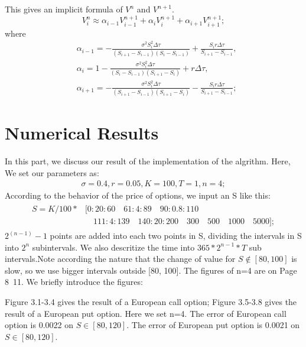 \documentclass[final]{siamltex}
\begin{document}
This gives an implicit formula of $V^n$ and $V^{n+1}$.
\begin{equation}
V_i^n \approx \alpha _{i-1} V_{i-1}^{n+1} + \alpha _{i} V_{i}^{n+1} + \alpha _{i+1} V_{i+1}^{n+1};
\label{FVM_Split}
\end{equation}
where 
\begin{equation}
\begin{split}
& \alpha_{i-1}  =  -\frac {\sigma^2 S_i^2 \Delta \tau}{(S_{i+1} -S_{i-1}) (S_{i}-S_{i-1})} + \frac{S_i r \Delta \tau} {S_{i+1}-S_{i-1}},\\
& \alpha_{i}  = 1 - \frac {\sigma^2 S_i^2 \Delta \tau}{(S_{i}-S_{i-1}) (S_{i+1}-S_i)} + r \Delta \tau,\\
& \alpha_{i+1}  = -\frac {\sigma^2 S_i^2 \Delta \tau}{(S_{i+1} -S_{i-1}) (S_{i+1}-S_i)} - \frac{S_i r \Delta \tau} {S_{i+1}-S_{i-1}};
\end{split}
\label{FVM_Coef}
\end{equation}

\section{Numerical Results}
In this part, we discuss our result of the implementation of the algrithm. Here, We set our parameters as:
\begin{align*}
\sigma = 0.4,
r = 0.05,
K = 100,
T = 1,
n=4;
\end{align*}
According to the behavior of the price of options, we input an S like this:
\begin{align*}
\begin{split}
S =  K/100*&[0:20:60 \quad 61:4:89 \quad 90:0.8:110 \quad \\
 & \quad 111:4:139 \quad 140:20:200 \quad 300 \quad 500 \quad 1000 \quad 5000];
\end{split}
\end{align*}
$2^{(n-1)}-1$ points are added into each two points in S, dividing the intervals in S into $2^n$ subintervals. We also descritize the time into $365*2^{n-1}*T$ sub intervals.Note according the nature that the change of value for $S \notin [80, 100]$ is slow, so we use bigger intervals outside [80, 100]. The figures of n=4 are on Page 8~11. We briefly introduce the figures: 

Figure 3.1-3.4 gives the result of a European call option; Figure 3.5-3.8 gives the result of a European put option. Here we set n=4. The error of European call option is 0.0022 on $S\in [80,120]$. The error of European put option is 0.0021 on $S\in [80,120]$. 
\end{document}
